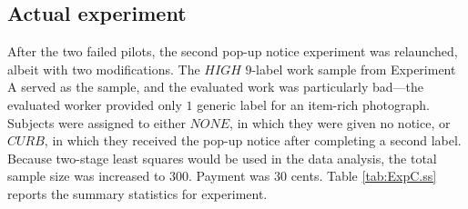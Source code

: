 \documentclass[12pt]{article}
\begin{document}
\subsection{Actual experiment}
After the two failed pilots, the second pop-up notice experiment was
relaunched, albeit with two modifications. The $HIGH$ $9$-label work
sample from Experiment A served as the sample, and the evaluated work
was particularly bad---the evaluated worker provided only $1$ generic
label for an item-rich photograph. Subjects were assigned to either
$NONE$, in which they were given no notice, or $CURB$, in which they
received the pop-up notice after completing a second label. Because
two-stage least squares would be used in the data analysis, the total
sample size was increased to $300$. Payment was 30 cents. Table
\ref{tab:ExpC.ss} reports the summary statistics for experiment.
\end{document}
